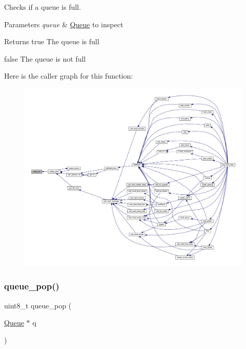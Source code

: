 Checks if a queue is full. 


\begin{DoxyParams}{Parameters}
{\em queue} & \mbox{\hyperlink{struct_queue}{Queue}} to inspect \\
\hline
\end{DoxyParams}
\begin{DoxyReturn}{Returns}
true The queue is full 

false The queue is not full 
\end{DoxyReturn}
Here is the caller graph for this function\+:\nopagebreak
\begin{figure}[H]
\begin{center}
\leavevmode
\includegraphics[width=350pt]{group__queue_gaca6621b01a2bae967c3c747bb6d855db_icgraph}
\end{center}
\end{figure}
\mbox{\label{group__queue_gaa7c283555566da64b71864f416e0178a}} 
\subsubsection{\texorpdfstring{queue\+\_\+pop()}{queue\_pop()}}
{\footnotesize\ttfamily uint8\+\_\+t queue\+\_\+pop (\begin{DoxyParamCaption}\item[{\mbox{\hyperlink{struct_queue}{Queue}} $\ast$}]{q }\end{DoxyParamCaption})}




